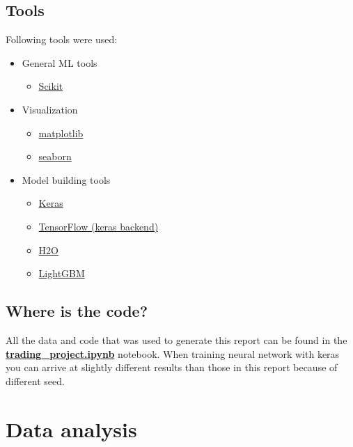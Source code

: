 \documentclass[final,2p]{elsarticle}
\begin{document}
\subsection{Tools}
Following tools were used:
\begin{itemize}
    \item General ML tools
    \begin{itemize}
        \item \href{https://scikit-learn.org/}{Scikit}
    \end{itemize}
    \item Visualization
        \begin{itemize}
            \item \href{https://matplotlib.org/}{matplotlib}
            \item \href{https://seaborn.pydata.org/}{seaborn}
        \end{itemize}
    \item Model building tools
        \begin{itemize}
            \item \href{https://keras.io/}{Keras}
            \item \href{https://www.tensorflow.org/}{TensorFlow (keras backend)}
            \item \href{https://www.h2o.ai/}{H2O}
            \item \href{https://lightgbm.readthedocs.io/}{LightGBM}
        \end{itemize}
\end{itemize}

\subsection{Where is the code?}
All the data and code that was used to generate this report can be found in the \href{https://github.com/IzidoroBaltazar/MachineLearningEngineer/blob/master/capstone\_project/trading\_project.ipynb}{\textbf{trading\_project.ipynb}} notebook.
When training neural network with keras you can arrive at slightly different results than those in this report because of different seed.

\section{Data analysis}
\end{document}
